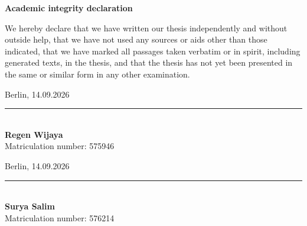 
\begin{center}
\normalsize \textbf{Academic integrity declaration}\\
\end{center}

\noindent
We hereby declare that we have written our thesis independently and without outside
help, that we have not used any sources or aids other than those indicated, that we
have marked all passages taken verbatim or in spirit, including generated texts, in
the thesis, and that the thesis has not yet been presented in the same or similar
form in any other examination.

\vspace{5em}

\noindent
\begin{minipage}[t]{0.46\textwidth}
	Berlin, 14.09.2026\\[3em]
	\rule{\linewidth}{0.4pt}\\[0.4em]
	\textbf{Regen Wijaya}\\
	Matriculation number: 575946
\end{minipage}
\hfill
\begin{minipage}[t]{0.46\textwidth}
	Berlin, 14.09.2026\\[3em]
	\rule{\linewidth}{0.4pt}\\[0.4em]
	\textbf{Surya Salim}\\
	Matriculation number: 576214
\end{minipage}